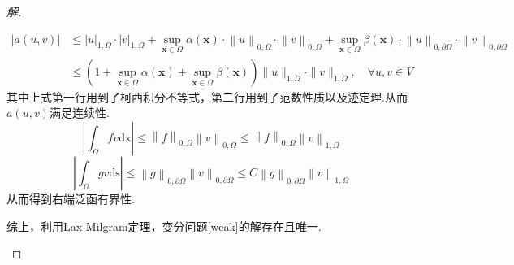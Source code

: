 \documentclass[12pt,a4paper]{article}
\begin{document}
\begin{enumerate}
\begin{proof}[解]
\begin{enumerate}
				\begin{equation*}
					\begin{aligned}
						|a(u,v)|&\leqslant\left|u\right|_{1,\Omega}\cdot\left|v\right|_{1,\Omega}+\sup_{\boldsymbol{x}\in\Omega}\alpha(\boldsymbol{x})\cdot\left\|u\right\|_{0,\Omega}\cdot\left\|v\right\|_{0,\Omega}+\sup_{\boldsymbol{x}\in\Omega}\beta(\boldsymbol{x})\cdot\left\|u\right\|_{0,\partial \Omega}\cdot\left\|v\right\|_{0,\partial \Omega}\\
						&\leqslant (1+\sup_{\boldsymbol{x}\in\Omega} \alpha(\boldsymbol{x})+\sup_{\boldsymbol{x}\in\Omega} \beta(\boldsymbol{x}))\|u\|_{1,\Omega}\cdot\|v\|_{1,\Omega},\quad\forall u,v\in V
					\end{aligned}
				\end{equation*}
				其中上式第一行用到了柯西积分不等式，第二行用到了范数性质以及迹定理.从而$a(u,v)$满足连续性.
			$$
			\left|\int_\Omega fv\mathrm{dx}\right|\leq\left\|f\right\|_{0,\Omega}\left\|v\right\|_{0,\Omega}\leq\left\|f\right\|_{0,\Omega}\left\|v\right\|_{1,\Omega}
			$$
			$$
			\left|\int_{\Omega}gv\mathrm{ds}\right|\leq\left\|g\right\|_{0,\partial\Omega}\left\|v\right\|_{0,\partial\Omega}\leq C\left\|g\right\|_{0,\partial\Omega}\left\|v\right\|_{1,\Omega}
			$$
			从而得到右端泛函有界性.
			
			综上，利用Lax-Milgram定理，变分问题\eqref{weak}的解存在且唯一.
			\end{enumerate}
		\end{proof}
		
	\end{enumerate}
	
	
	
\end{document}
